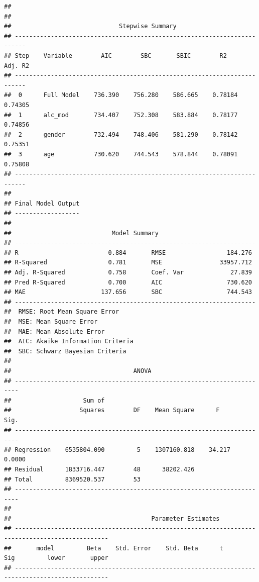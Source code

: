 \documentclass[
]{book}
\begin{document}
\begin{verbatim}
## 
## 
##                              Stepwise Summary                              
## -------------------------------------------------------------------------
## Step    Variable        AIC        SBC       SBIC        R2       Adj. R2 
## -------------------------------------------------------------------------
##  0      Full Model    736.390    756.280    586.665    0.78184    0.74305 
##  1      alc_mod       734.407    752.308    583.884    0.78177    0.74856 
##  2      gender        732.494    748.406    581.290    0.78142    0.75351 
##  3      age           730.620    744.543    578.844    0.78091    0.75808 
## -------------------------------------------------------------------------
## 
## Final Model Output 
## ------------------
## 
##                            Model Summary                            
## -------------------------------------------------------------------
## R                         0.884       RMSE                 184.276 
## R-Squared                 0.781       MSE                33957.712 
## Adj. R-Squared            0.758       Coef. Var             27.839 
## Pred R-Squared            0.700       AIC                  730.620 
## MAE                     137.656       SBC                  744.543 
## -------------------------------------------------------------------
##  RMSE: Root Mean Square Error 
##  MSE: Mean Square Error 
##  MAE: Mean Absolute Error 
##  AIC: Akaike Information Criteria 
##  SBC: Schwarz Bayesian Criteria 
## 
##                                  ANOVA                                  
## -----------------------------------------------------------------------
##                    Sum of                                              
##                   Squares        DF    Mean Square      F         Sig. 
## -----------------------------------------------------------------------
## Regression    6535804.090         5    1307160.818    34.217    0.0000 
## Residual      1833716.447        48      38202.426                     
## Total         8369520.537        53                                    
## -----------------------------------------------------------------------
## 
##                                       Parameter Estimates                                        
## ------------------------------------------------------------------------------------------------
##       model         Beta    Std. Error    Std. Beta      t        Sig         lower       upper 
## ------------------------------------------------------------------------------------------------

\end{verbatim}
\end{document}
